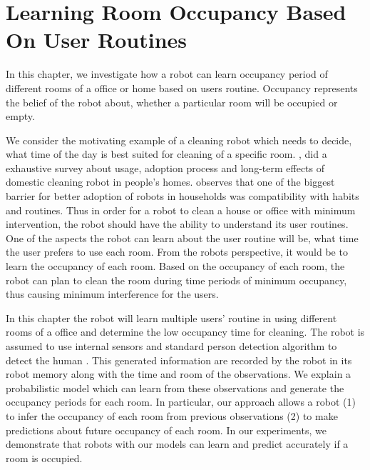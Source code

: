 \chapter{Learning Room Occupancy Based On User Routines}
\label{chapter:occupancy}
In this chapter, we investigate how a robot can learn occupancy period of different rooms of a office or home based on users routine. Occupancy represents the belief of the robot about, whether a particular room will be occupied or empty. 

We consider the motivating example of a cleaning robot which needs to decide, what time of the day is best suited for cleaning of a specific room. \cite{Fink2013},  did a exhaustive survey about usage, adoption process and long-term effects of domestic cleaning robot in people's homes. \citeauthor{Fink2013} observes that one of the biggest barrier for better adoption of robots in households was compatibility with habits and routines. Thus in order for a robot to clean a house or office with minimum intervention, the robot should have the ability to understand its user routines. One of the aspects the robot can learn about the user routine will be, what time the user prefers to use each room. From the robots perspective, it would be to learn the occupancy of each room. Based on the occupancy of each room, the robot can plan to clean the room during time periods of minimum occupancy, thus causing minimum interference for the users.

In this chapter the robot will learn multiple users' routine in using different rooms of a office and determine the low occupancy time for cleaning.
The robot is assumed to use internal sensors and standard person detection algorithm to detect the human \cite{linder16multi, jafari2014real}. This generated information are recorded by the robot in its robot memory along with the time and room of the observations. We explain a probabilistic model which can learn from these observations and generate the occupancy periods for each room. In particular, our approach allows a robot (1) to infer the occupancy of each room from previous observations (2) to make predictions about future occupancy of each room. In our experiments, we demonstrate that robots with our models can learn and predict accurately if a room is occupied.


